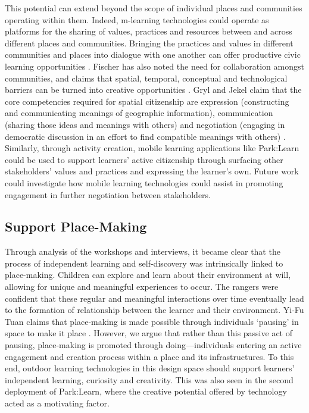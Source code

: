 This potential can extend beyond the scope of individual places and communities operating within them. Indeed, m-learning technologies could operate as platforms for the sharing of values, practices and resources between and across different places and communities.  Bringing the practices and values in different communities and places into dialogue with one another can offer productive civic learning opportunities \citep{Wegerif2007}.  Fischer has also noted the need for collaboration amongst communities,  and claims that spatial, temporal, conceptual and technological barriers can be turned into creative opportunities \citep{Fischer2004}. Gryl and Jekel claim that the core competencies required for spatial citizenship are expression (constructing and communicating meanings of geographic information), communication (sharing those ideas and meanings with others) and negotiation (engaging in democratic discussion in an effort to find compatible meanings with others) \citep{Gryl2012}. Similarly, through activity creation, mobile learning applications like Park:Learn could be used to support learners’ active citizenship through surfacing other stakeholders’ values and practices and expressing the learner’s own. Future work could investigate how mobile learning technologies could assist in promoting engagement in further negotiation between stakeholders.

\subsection{Support Place-Making}

Through analysis of the workshops and interviews, it became clear that the process of independent learning and self-discovery was intrinsically linked to place-making. Children can explore and learn about their environment at will, allowing for unique and meaningful experiences to occur. The rangers were confident that these regular and meaningful interactions over time eventually lead to the formation of relationship between the learner and their environment. Yi-Fu Tuan claims that place-making is made possible through individuals ‘pausing’ in space to make it place \citep{Tuan1978}. However, we argue that rather than this passive act of pausing, place-making is promoted through doing---individuals entering an active engagement and creation process within a place and its infrastructures. To this end, outdoor learning technologies in this design space should support learners’ independent learning, curiosity and creativity. This was also seen in the second deployment of Park:Learn, where the creative potential offered by technology acted as a motivating factor.

